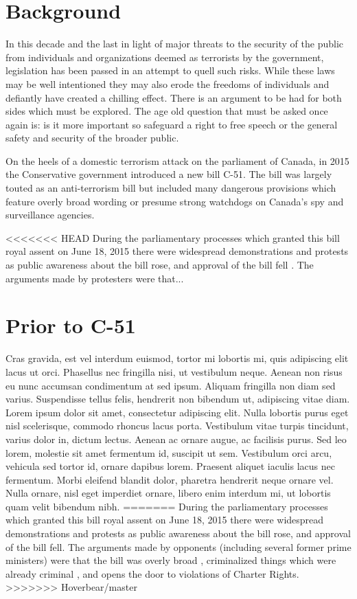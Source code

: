 \documentclass[a4paper, 11pt]{article} %
\begin{document}
\section*{Background}
In this decade and the last in light of major threats to the security of the public from individuals and organizations deemed as terrorists by the government, legislation has been passed in an attempt to quell such risks. While these laws may be well intentioned they may also erode the freedoms of individuals and defiantly have created a chilling effect. There is an argument to be had for both sides which must be explored. The age old question that must be asked once again is: is it more important so safeguard a right to free speech or the general safety and security of the broader public.

On the heels of a domestic terrorism attack on the parliament of Canada, in 2015 the Conservative government introduced a new bill C-51. The bill was largely touted as an anti-terrorism bill but included many dangerous provisions which feature overly broad wording or presume strong watchdogs on Canada's spy and surveillance agencies.

<<<<<<< HEAD
During the parliamentary processes which granted this bill royal assent on June 18, 2015 there were widespread demonstrations and protests as public awareness about the bill rose, and approval of the bill fell \cite{haydn_watters_5_2015}. The arguments made by protesters were that...


\section*{Prior to C-51}

Cras gravida, est vel interdum euismod, tortor mi lobortis mi, quis adipiscing elit lacus ut orci. Phasellus nec fringilla nisi, ut vestibulum neque. Aenean non risus eu nunc accumsan condimentum at sed ipsum.
Aliquam fringilla non diam sed varius. Suspendisse tellus felis, hendrerit non bibendum ut, adipiscing vitae diam. Lorem ipsum dolor sit amet, consectetur adipiscing elit. Nulla lobortis purus eget nisl scelerisque, commodo rhoncus lacus porta. Vestibulum vitae turpis tincidunt, varius dolor in, dictum lectus. Aenean ac ornare augue, ac facilisis purus. Sed leo lorem, molestie sit amet fermentum id, suscipit ut sem. Vestibulum orci arcu, vehicula sed tortor id, ornare dapibus lorem. Praesent aliquet iaculis lacus nec fermentum. Morbi eleifend blandit dolor, pharetra hendrerit neque ornare vel. Nulla ornare, nisl eget imperdiet ornare, libero enim interdum mi, ut lobortis quam velit bibendum nibh.
=======
During the parliamentary processes which granted this bill royal assent on June 18, 2015 there were widespread demonstrations and protests as public awareness about the bill rose, and approval of the bill fell. \cite{popularity} The arguments made by opponents (including several former prime ministers) were that the bill was overly broad \cite{businesses}, criminalized things which were already criminal \cite{bar}, and opens the door to violations of Charter Rights. \cite{liberty-for-security}
>>>>>>> Hoverbear/master
\end{document}
